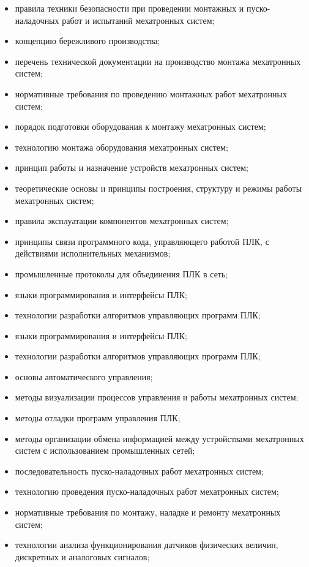 \begin{itemize}
    \item правила техники безопасности при проведении монтажных и пуско-наладочных работ и испытаний мехатронных систем;
    \item концепцию бережливого производства;
    \item перечень технической документации на производство монтажа мехатронных систем;
    \item нормативные требования по проведению монтажных работ мехатронных систем;
    \item порядок подготовки оборудования к монтажу мехатронных систем;
    \item технологию монтажа оборудования мехатронных систем;
    \item принцип работы и назначение устройств мехатронных систем;
    \item теоретические основы и принципы построения, структуру и режимы работы мехатронных систем;
    \item правила эксплуатации компонентов мехатронных систем;
    \item принципы связи программного кода, управляющего работой ПЛК, с действиями исполнительных механизмов;
    \item промышленные протоколы для объединения ПЛК в сеть;
    \item языки программирования и интерфейсы ПЛК;
    \item технологии разработки алгоритмов управляющих программ ПЛК;
    \item языки программирования и интерфейсы ПЛК;
    \item технологии разработки алгоритмов управляющих программ ПЛК;
    \item основы автоматического управления;
    \item методы визуализации процессов управления и работы мехатронных систем;
    \item методы отладки программ управления ПЛК;
    \item методы организации обмена информацией между устройствами мехатронных систем с использованием промышленных сетей;
    \item последовательность пуско-наладочных работ мехатронных систем;
    \item технологию проведения пуско-наладочных работ мехатронных систем;
    \item нормативные требования по монтажу, наладке и ремонту мехатронных систем;
    \item технологии анализа функционирования датчиков физических величин, дискретных и аналоговых сигналов;

\end{itemize}
